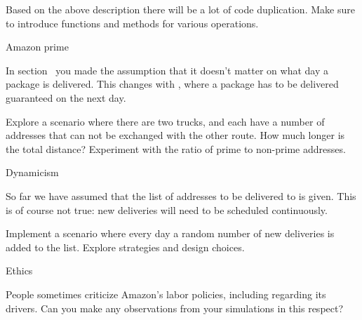 Based on the above description there will be a lot of code
duplication. Make sure to introduce functions and methods for various
operations.

 {Amazon prime}

In section~ you made the assumption that it
doesn't matter on what day a package is delivered. This changes with
, where a package has to be delivered
guaranteed on the next day.

\begin{exercise}
  Explore a scenario where there are two trucks, and each have a number
  of addresses that can not be exchanged with the other route.
  How much longer is the total distance? Experiment with
  the ratio of prime to non-prime addresses.
\end{exercise}

 {Dynamicism}

So far we have assumed that the list of addresses to be delivered to
is given. This is of course not true: new deliveries will need to be
scheduled continuously.

\begin{exercise}
  Implement a scenario where every day a random number of new
  deliveries is added to the list. Explore strategies and design choices.
\end{exercise}

 {Ethics}

People sometimes criticize Amazon's labor policies,
including regarding its drivers.
Can you make any observations from your simulations in this respect?

